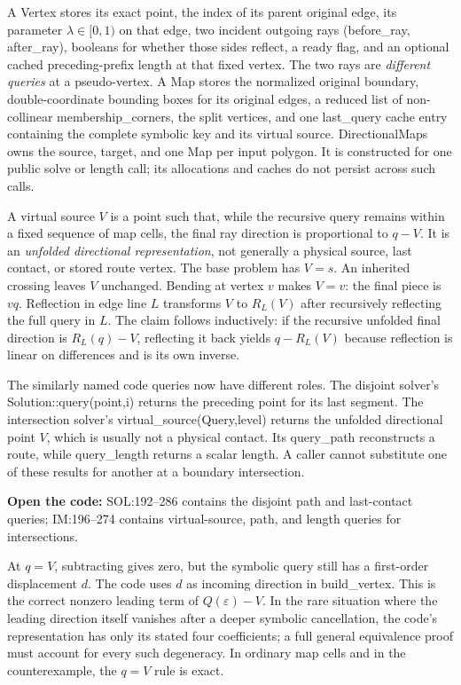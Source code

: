 \documentclass[12pt,a4paper]{article}
\newcommand{\code}[1]{{\ttfamily\color{codekw}#1}}
\begin{document}
A \code{Vertex} stores its exact point, the index of its parent original edge, its parameter \(\lambda\in[0,1)\) on that edge, two incident outgoing rays (\code{before\_ray}, \code{after\_ray}), booleans for whether those sides reflect, a \code{ready} flag, and an optional cached preceding-prefix length at that fixed vertex. The two rays are \emph{different queries} at a pseudo-vertex. A \code{Map} stores the normalized original boundary, double-coordinate bounding boxes for its original edges, a reduced list of non-collinear \code{membership\_corners}, the split \code{vertices}, and one \code{last\_query} cache entry containing the complete symbolic key and its virtual source. \code{DirectionalMaps} owns the source, target, and one Map per input polygon. It is constructed for one public solve or length call; its allocations and caches do not persist across such calls.

A virtual source \(V\) is a point such that, while the recursive query remains within a fixed sequence of map cells, the final ray direction is proportional to \(q-V\). It is an \emph{unfolded directional representation}, not generally a physical source, last contact, or stored route vertex. The base problem has \(V=s\). An inherited crossing leaves \(V\) unchanged. Bending at vertex \(v\) makes \(V=v\): the final piece is \(vq\). Reflection in edge line \(L\) transforms \(V\) to \(R_L(V)\) after recursively reflecting the full query in \(L\). The claim follows inductively: if the recursive unfolded final direction is \(R_L(q)-V\), reflecting it back yields \(q-R_L(V)\) because reflection is linear on differences and is its own inverse.

The similarly named code queries now have different roles. The disjoint solver's \code{Solution::query(point,i)} returns the preceding point for its last segment. The intersection solver's \code{virtual\_source(Query,level)} returns the unfolded directional point \(V\), which is usually not a physical contact. Its \code{query\_path} reconstructs a route, while \code{query\_length} returns a scalar length. A caller cannot substitute one of these results for another at a boundary intersection.
\begin{sourcebox}
\textbf{Open the code:} \code{SOL:192--286} contains the disjoint path and last-contact queries; \code{IM:196--274} contains virtual-source, path, and length queries for intersections.
\end{sourcebox}

At \(q=V\), subtracting gives zero, but the symbolic query still has a first-order displacement \(d\). The code uses \(d\) as incoming direction in \code{build\_vertex}. This is the correct nonzero leading term of \(Q(\varepsilon)-V\). In the rare situation where the leading direction itself vanishes after a deeper symbolic cancellation, the code's representation has only its stated four coefficients; a full general equivalence proof must account for every such degeneracy. In ordinary map cells and in the counterexample, the \(q=V\) rule is exact.
\end{document}
